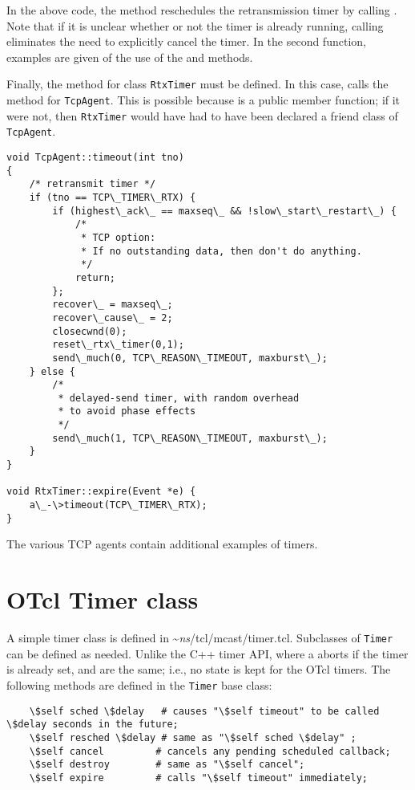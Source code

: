 In the above code, the  method reschedules the 
retransmission timer by calling .  Note that if
it is unclear whether or not the timer is already running, calling
 eliminates the need to explicitly cancel the timer.  In
the second function, examples are given of the use of the 
and  methods.

Finally, the  method for class {\tt RtxTimer} must be 
defined.  In this case,  calls the  method
for {\tt TcpAgent}.  This is possible because  is a 
public member function; if it were not, then {\tt RtxTimer} would have
had to have been declared a friend class of {\tt TcpAgent}.
\begin{verbatim}
void TcpAgent::timeout(int tno)
{                     
    /* retransmit timer */
    if (tno == TCP\_TIMER\_RTX) {
        if (highest\_ack\_ == maxseq\_ && !slow\_start\_restart\_) {
            /*
             * TCP option:
             * If no outstanding data, then don't do anything.
             */
            return;  
        };
        recover\_ = maxseq\_;
        recover\_cause\_ = 2;
        closecwnd(0);
        reset\_rtx\_timer(0,1);
        send\_much(0, TCP\_REASON\_TIMEOUT, maxburst\_); 
    } else {
        /* 
         * delayed-send timer, with random overhead
         * to avoid phase effects  
         */     
        send\_much(1, TCP\_REASON\_TIMEOUT, maxburst\_);
    }           
}           
            
void RtxTimer::expire(Event *e) {
    a\_-\>timeout(TCP\_TIMER\_RTX);
}
\end{verbatim}

The various TCP agents contain additional examples of timers.

\section{OTcl Timer class}
\label{sec:otcltimer}

A simple timer class is defined in \textasciitilde\emph{ns}/{tcl/mcast/timer.tcl}.  Subclasses of
{\tt Timer} can be defined as needed.  Unlike the C++ timer API, where a 
 aborts if the timer is already set,  and
 are the same; i.e., no state is kept for the OTcl timers.
The following methods are defined in the {\tt Timer} base class:
\begin{verbatim}
    \$self sched \$delay   # causes "\$self timeout" to be called \$delay seconds in the future;
    \$self resched \$delay # same as "\$self sched \$delay" ;
    \$self cancel         # cancels any pending scheduled callback;
    \$self destroy        # same as "\$self cancel";
    \$self expire         # calls "\$self timeout" immediately;
\end{verbatim}

